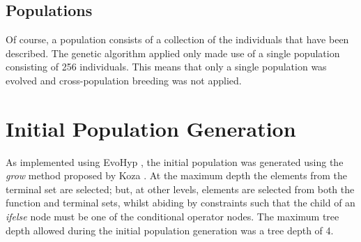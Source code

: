 \subsection{Populations}
Of course, a population consists of a collection of the individuals that have been described. The genetic algorithm applied only made use of a single population consisting of 256 individuals. This means that only a single population was evolved and cross-population breeding was not applied.

\section{Initial Population Generation}

As implemented using EvoHyp \cite{pillay2017evohyp}, the initial population was generated using the \emph{grow} method proposed by Koza \cite{koza1992genetic}. At the maximum depth the elements from the terminal set are selected; but, at other levels, elements are selected from both the function and terminal sets, whilst abiding by constraints such that the child of an \emph{ifelse} node must be one of the conditional operator nodes. The maximum tree depth allowed during the initial population generation was a tree depth of 4.